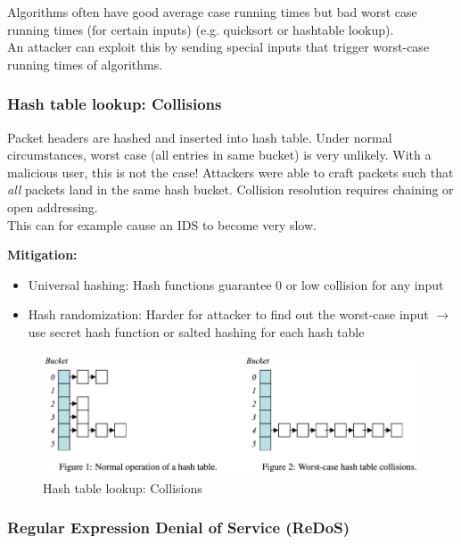 \documentclass[11pt,oneside,a4paper]{article}
\begin{document}
Algorithms often have good average case running times but bad worst case running times (for certain inputs) (e.g. quicksort or hashtable lookup).\\
An attacker can exploit this by sending special inputs that trigger worst-case running times of algorithms.

\subsubsection{Hash table lookup: Collisions}

Packet headers are hashed and inserted into hash table. Under normal circumstances, worst case (all entries in same bucket) is very unlikely. With a malicious user, this is not the case! Attackers were able to craft packets such that \textit{all} packets land in the same hash bucket. Collision resolution requires chaining or open addressing.\\
This can for example cause an IDS to become very slow.

\newpage

\textbf{Mitigation:}

\vspace{-\topsep}
\begin{itemize}
	\setlength{\itemsep}{0pt}
	\setlength{\parskip}{0pt}
	\item Universal hashing:	Hash functions guarantee 0 or low collision for any input
	\item Hash randomization: Harder for attacker to find out the worst-case input
	\subitem $\rightarrow$ use secret hash function or salted hashing for each hash table
\end{itemize}
\vspace{-\topsep}


\begin{figure}
	\centering
	\includegraphics[width=0.5\linewidth]{figures/ddos_hash_collision}
	\caption{Hash table lookup: Collisions}
	\label{fig:ddoshashcollision}
\end{figure}

\subsubsection{Regular Expression Denial of Service (ReDoS)}
\end{document}
